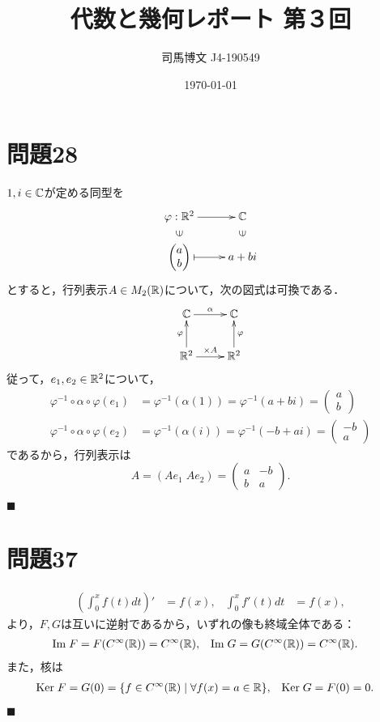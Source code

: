 \documentclass[uplatex, dvipdfmx]{jsarticle}
\title{代数と幾何レポート 第３回}
\author{司馬博文 J4-190549}
\date{\today}
\begin{document}
\maketitle

\section*{問題28}

$1,i\in\mathbb{C}$が定める同型を
\[\xymatrix@R-2pc{
    \varphi:\R^2\ar[r]&\C\\
    \rotatebox[origin=c]{90}{$\in$}&\rotatebox[origin=c]{90}{$\in$}\\
    {\begin{pmatrix}a\\b\end{pmatrix}}\ar@{|->}[r]&a+bi
}\]
とすると，行列表示$A\in M_2(\mathbb{R})$について，次の図式は可換である．
\[\xymatrix{
    \C\ar[r]^-{\alpha}&\C\\
    \R^2\ar[u]^-{\varphi}\ar[r]^-{\times A}&\R^2\ar[u]_-{\varphi}
}\]
従って，$e_1,e_2\in\mathbb{R}^2$について，
\begin{align*}
    \varphi^{-1}\circ\alpha\circ\varphi(e_1)&=\varphi^{-1}(\alpha(1))=\varphi^{-1}(a+bi)=\begin{pmatrix}a\\b\end{pmatrix}\\
    \varphi^{-1}\circ\alpha\circ\varphi(e_2)&=\varphi^{-1}(\alpha(i))=\varphi^{-1}(-b+ai)=\begin{pmatrix}-b\\a\end{pmatrix}
\end{align*}
であるから，行列表示は
\[ A=(Ae_1\;Ae_2)=\begin{pmatrix}a&-b\\b&a\end{pmatrix}. \]
\begin{flushright}$\blacksquare$\end{flushright}

\section*{問題37}

\begin{align*}
    \left(\int^x_0f(t)dt\right)'&=f(x),&
    \int^x_0f'(t)dt&=f(x),
\end{align*}
より，$F,G$は互いに逆射であるから，いずれの像も終域全体である：
\begin{align*}
    \mathrm{Im}\; F=F(C^\infty(\mathbb{R}))&=C^\infty(\mathbb{R}),&\mathrm{Im}\; G=G(C^\infty(\mathbb{R}))&=C^\infty(\mathbb{R}).
\end{align*}
また，核は
\begin{align*}
    \mathrm{Ker}\; F&=G(0)=\{f\in C^\infty(\mathbb{R})\mid \forall f(x)= a\in\mathbb{R}\},&\mathrm{Ker}\; G&=F(0)=0.
\end{align*}
\begin{flushright}$\blacksquare$\end{flushright}
\end{document}
